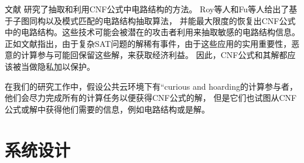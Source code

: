 文献\cite{csLiequivalency,csOstrowski,csRoy,csFu}
研究了抽取和利用CNF公式中电路结构的方法。
Roy等人\cite{csRoy}和Fu等人\cite{csFu}给出了基于子图同构以及模式匹配的电路结构抽取算法，
并能最大限度的恢复出CNF公式中的电路结构。这些技术可能会被潜在的攻击者利用来抽取敏感的电路结构信息。
正如文献\cite{HV-grid}指出，由于复杂SAT问题的解稀有事件，由于这些应用的实用重要性，恶意的计算参与可能回保留这些解，来获取经济利益。
因此，CNF公式和其解都应该被当做隐私加以保护。

在我们的研究工作中，假设公共云环境下有“curious and hoarding的计算参与者，他们会尽力完成所有的计算任务以便获得CNF公式的解，
但是它们也试图从CNF公式或解中获得他们需要的信息，例如电路结构或是解。

\section{系统设计}

